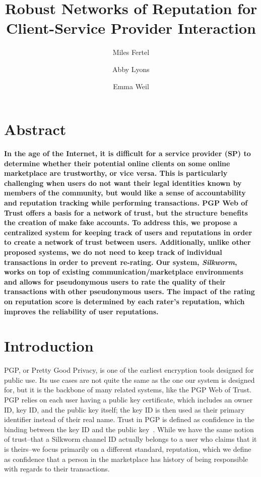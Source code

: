 \documentclass[letterpaper,twocolumn,10pt]{article}
\begin{document}
\date{}

\title{\Large \bf Robust Networks of Reputation for Client-Service Provider Interaction}

\author{
{\rm Miles Fertel}\\
\and
{\rm Abby Lyons}\\
\and
{\rm Emma Weil}\\
}

\maketitle

\thispagestyle{empty}


\section*{Abstract}
\textbf{In the age of the Internet, it is difficult for a service provider (SP) to determine whether their potential online clients on some online marketplace are trustworthy, or vice versa. This is particularly challenging when users do not want their legal identities known by members of the community, but would like a sense of accountability and reputation tracking while performing transactions. PGP Web of Trust offers a basis for a network of trust, but the structure benefits the creation of make fake accounts. To address this, we propose a centralized system for keeping track of users and reputations in order to create a network of trust between users. Additionally, unlike other proposed systems, we do not need to keep track of individual transactions in order to prevent re-rating. Our system, \textit{Silkworm}, works on top of existing communication/marketplace environments and allows for pseudonymous users to rate the quality of their transactions with other pseudonymous users. The impact of the rating on reputation score is determined by each rater's reputation, which improves the reliability of user reputations.}

\section{Introduction}
PGP, or Pretty Good Privacy, is one of the earliest encryption tools designed for public use. Its use cases are not quite the same as the one our system is designed for, but it is the backbone of many related systems, like the PGP Web of Trust. PGP relies on each user having a public key certificate, which includes an owner ID, key ID, and the public key itself; the key ID is then used as their primary identifier instead of their real name. Trust in PGP is defined as confidence in the binding between the key ID and the public key~\cite{PGPWebTrust}. While we have the same notion of trust--that a Silkworm channel ID actually belongs to a user who claims that it is theirs--we focus primarily on a different standard, reputation, which we define as confidence that a person in the marketplace has history of being responsible with regards to their transactions.
\end{document}
